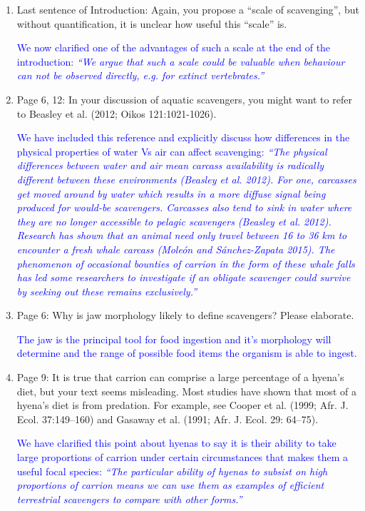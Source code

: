 \documentclass[12pt,letterpaper]{article}
\begin{document}
\begin{enumerate}
\item{Last sentence of Introduction: Again, you propose a ``scale of scavenging'', but without quantification, it is unclear how useful this ``scale'' is.}

\textcolor{blue}{We now clarified one of the advantages of such a scale at the end of the introduction: \textit{``We argue that such a scale could be valuable when behaviour can not be observed directly, e.g. for extinct vertebrates.''}}

\item{Page 6, 12: In your discussion of aquatic scavengers, you might want to refer to Beasley et al. (2012; Oikos 121:1021-1026).}

\textcolor{blue}{We have included this reference and explicitly discuss how differences in the physical properties of water Vs air can affect scavenging: \textit{``The physical differences between water and air mean carcass availability is radically different between these environments (Beasley et al. 2012). For one, carcasses get moved around by water which results in a more diffuse signal being produced for would-be scavengers. Carcasses also tend to sink in water where they are no longer accessible to pelagic scavengers (Beasley et al. 2012). Research has shown that an animal need only travel between 16 to 36 km to encounter a fresh whale carcass  (Mole\'{o}n and Sánchez-Zapata 2015). The phenomenon of occasional bounties of carrion in the form of these whale falls has led some researchers to investigate if an obligate scavenger could survive by seeking out these remains exclusively.''}}

\item{Page 6: Why is jaw morphology likely to define scavengers?  Please elaborate.}

\textcolor{blue}{The jaw is the principal tool for food ingestion and it's morphology will determine and the range of possible food items the organism is able to ingest.}

\item{Page 9: It is true that carrion can comprise a large percentage of a hyena's diet, but your text seems misleading. Most studies have shown that most of a hyena's diet is from predation. For example, see Cooper et al. (1999; Afr. J. Ecol. 37:149–160) and Gasaway et al. (1991; Afr. J. Ecol. 29: 64–75).}

\textcolor{blue}{We have clarified this point about hyenas to say it is their ability to take large proportions of carrion under certain circumstances that makes them a useful focal species: \textit{``The particular ability of hyenas to subsist on high proportions of carrion means we can use them as examples of efficient terrestrial scavengers to compare with other forms.''}}


\end{enumerate}
\end{document}
